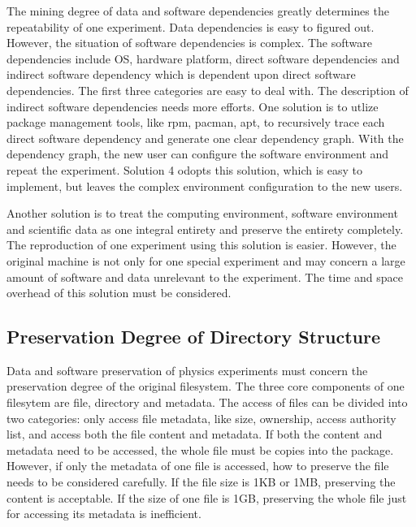 \documentclass{acm_proc_article-sp}
\begin{document}
The mining degree of data and software dependencies greatly determines the
repeatability of one experiment. Data dependencies is easy to figured out. However, the situation of software dependencies is complex. The software
dependencies include OS, hardware platform, 
direct software dependencies and indirect software dependency which is dependent upon direct software dependencies.
The first
three categories are easy to deal with. The description of indirect software
dependencies needs more efforts. One solution is to utlize package management
tools, like rpm, pacman, apt, to recursively trace each direct software
dependency and generate one clear dependency graph. With the dependency graph,
the new user can configure the software environment and repeat the experiment.
Solution 4 odopts this solution, which is easy to implement, but leaves the
complex environment configuration to the new users. 

Another solution is to treat the computing environment, software environment
and scientific data as one integral entirety and preserve the entirety
completely. The reproduction of one experiment using this solution is easier.
However, the original machine is not only for one special experiment and may
concern a large amount of software and data unrelevant to the experiment. The
time and space overhead of this solution must be considered.

\subsection{Preservation Degree of Directory Structure}

Data and software preservation of physics experiments must concern the
preservation degree of the original filesystem.  The three core components of
one filesytem are file, directory and metadata.  The access of files can be
divided into two categories: only access file metadata, like size, ownership,
access authority list, and access both the file content and metadata.  If both
the content and metadata need to be accessed, the whole file must be copies
into the package.  However, if only the metadata of one file is accessed, how
to preserve the file needs to be considered carefully. If the file size
is 1KB or 1MB, preserving the content is acceptable. If the size of one file is
1GB, preserving the whole file just for accessing its metadata is
inefficient.  
\end{document}
